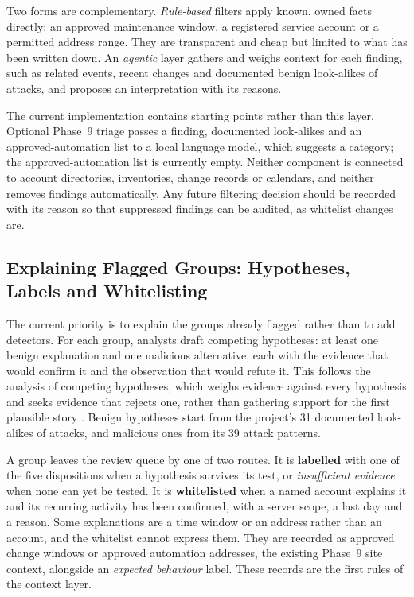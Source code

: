 \documentclass[11pt,a4paper]{article}
\begin{document}
Two forms are complementary. \emph{Rule-based} filters apply known, owned facts directly: an approved maintenance window, a registered service account or a permitted address range. They are transparent and cheap but limited to what has been written down. An \emph{agentic} layer gathers and weighs context for each finding, such as related events, recent changes and documented benign look-alikes of attacks, and proposes an interpretation with its reasons.

The current implementation contains starting points rather than this layer. Optional Phase~9 triage passes a finding, documented look-alikes and an approved-automation list to a local language model, which suggests a category; the approved-automation list is currently empty. Neither component is connected to account directories, inventories, change records or calendars, and neither removes findings automatically. Any future filtering decision should be recorded with its reason so that suppressed findings can be audited, as whitelist changes are.

\subsection{Explaining Flagged Groups: Hypotheses, Labels and Whitelisting}\label{sec:core-hypotheses}

The current priority is to explain the groups already flagged rather than to add detectors. For each group, analysts draft competing hypotheses: at least one benign explanation and one malicious alternative, each with the evidence that would confirm it and the observation that would refute it. This follows the analysis of competing hypotheses, which weighs evidence against every hypothesis and seeks evidence that rejects one, rather than gathering support for the first plausible story \cite{ref13}. Benign hypotheses start from the project's 31 documented look-alikes of attacks, and malicious ones from its 39 attack patterns.

A group leaves the review queue by one of two routes. It is \textbf{labelled} with one of the five dispositions when a hypothesis survives its test, or \emph{insufficient evidence} when none can yet be tested. It is \textbf{whitelisted} when a named account explains it and its recurring activity has been confirmed, with a server scope, a last day and a reason. Some explanations are a time window or an address rather than an account, and the whitelist cannot express them. They are recorded as approved change windows or approved automation addresses, the existing Phase~9 site context, alongside an \emph{expected behaviour} label. These records are the first rules of the context layer.
\end{document}
